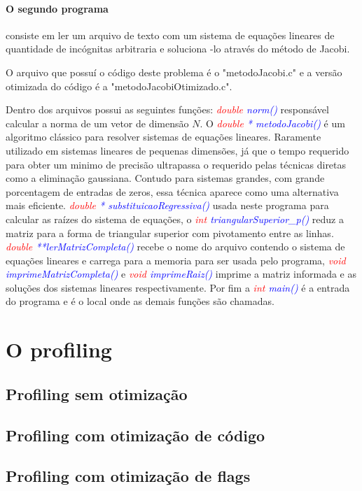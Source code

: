 \documentclass[]{article}
\begin{document}
\paragraph{O segundo programa} consiste em ler um arquivo de texto com um sistema de equações lineares de quantidade de incógnitas arbitraria e soluciona -lo através do método de Jacobi.

O arquivo que possuí o código deste problema é o "metodoJacobi.c" e a versão otimizada do código é a  "metodoJacobiOtimizado.c". 

Dentro dos arquivos possui as seguintes funções: \textit{\textcolor{red}{double} \textcolor{blue}{norm()}} responsável calcular a norma de um vetor de dimensão $N$. O \textit{\textcolor{red}{double} \textcolor{blue}{* metodoJacobi()}} é um algoritmo clássico para resolver sistemas de equações lineares. Raramente utilizado em sistemas lineares de pequenas dimensões, já que o tempo requerido para obter um minimo de precisão ultrapassa o requerido pelas técnicas diretas como a eliminação gaussiana. Contudo para sistemas grandes, com grande porcentagem de entradas de zeros, essa técnica aparece como uma alternativa mais eficiente. \textit{\textcolor{red}{double} \textcolor{blue}{* substituicaoRegressiva()}} usada neste programa para calcular as raízes do sistema de equações, o \textit{\textcolor{red}{int} \textcolor{blue}{ triangularSuperior\_p()}} reduz a matriz para a forma de triangular superior com pivotamento entre as linhas. \textit{\textcolor{red}{double} \textcolor{blue}{**lerMatrizCompleta()}} recebe o nome do arquivo contendo o sistema de equações lineares e carrega para a memoria para ser usada pelo programa, \textit{\textcolor{red}{void} \textcolor{blue}{ imprimeMatrizCompleta()}} e \textit{\textcolor{red}{void} \textcolor{blue}{imprimeRaiz()}} imprime a matriz informada e as soluções dos sistemas lineares respectivamente.  Por fim a \textit{\textcolor{red}{int} \textcolor{blue}{main()}} é a entrada do programa e é o local onde as demais funções são chamadas.

\section{O profiling}

\subsection{Profiling sem otimização}

\subsection{Profiling com otimização de código}

\subsection{Profiling com otimização de flags}
\end{document}

